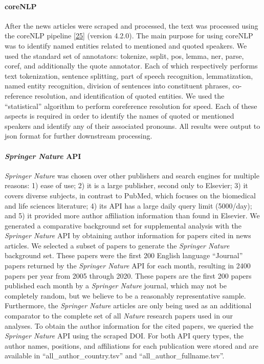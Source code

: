 \hypertarget{corenlp}{%
\paragraph{coreNLP}\label{corenlp}}

After the news articles were scraped and processed, the text was processed using the coreNLP pipeline {[}\protect\hyperlink{ref-RQkLuc5t}{25}{]} (version 4.2.0).
The main purpose for using coreNLP was to identify named entities related to mentioned and quoted speakers.
We used the standard set of annotators: tokenize, ssplit, pos, lemma, ner, parse, coref, and additionally the quote annotator.
Each of which respectively performs text tokenization, sentence splitting, part of speech recognition, lemmatization, named entity recognition, division of sentences into constituent phrases, co-reference resolution, and identification of quoted entities.
We used the ``statistical'' algorithm to perform coreference resolution for speed.
Each of these aspects is required in order to identify the names of quoted or mentioned speakers and identify any of their associated pronouns.
All results were output to json format for further downstream processing.

\hypertarget{springer-nature-api}{%
\paragraph{\texorpdfstring{\emph{Springer Nature} API}{Springer Nature API}}\label{springer-nature-api}}

\emph{Springer Nature} was chosen over other publishers and search engines for multiple reasons: 1) ease of use; 2) it is a large publisher, second only to Elsevier; 3) it covers diverse subjects, in contrast to PubMed, which focuses on the biomedical and life sciences literature; 4) its API has a large daily query limit (5000/day); and 5) it provided more author affiliation information than found in Elsevier.
We generated a comparative background set for supplemental analysis with the \emph{Springer Nature} API by obtaining author information for papers cited in news articles.
We selected a subset of papers to generate the \emph{Springer Nature} background set.
These papers were the first 200 English language ``Journal'' papers returned by the \emph{Springer Nature} API for each month, resulting in 2400 papers per year from 2005 through 2020.
These papers are the first 200 papers published each month by a \emph{Springer Nature} journal, which may not be completely random, but we believe to be a reasonably representative sample.
Furthermore, the \emph{Springer Nature} articles are only being used as an additional comparator to the complete set of all \emph{Nature} research papers used in our analyses.
To obtain the author information for the cited papers, we queried the \emph{Springer Nature} API using the scraped DOI.
For both API query types, the author names, positions, and affiliations for each publication were stored and are available in ``all\_author\_country.tsv'' and ``all\_author\_fullname.tsv''.

